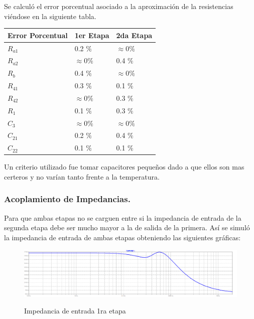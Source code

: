 Se calculó el error porcentual asociado a la aproximación de la resistencias viéndose en la siguiente tabla.
\begin{table}[H]
\centering
\begin{tabular}{lll}
\multicolumn{1}{c}{Error Porcentual} & \multicolumn{1}{c}{1er Etapa} & \multicolumn{1}{c}{2da Etapa} \\ \hline
$R_{a1}$                                & 0.2 $\%$                      & $\approx 0 \%$                \\
$R_{a2}$                                & $\approx 0 \%$                & 0.4 $\%$                      \\
$R_b$                                & 0.4 $\%$                      & $\approx 0 \%$                \\
$R_{41}$                                & 0.3 $\%$                      & 0.1 $\%$                      \\
$R_{42}$                                & $\approx 0 \%$                & 0.3 $\%$                      \\
$R_1$                                & 0.1 $\%$                      & 0.3 $\%$                      \\
$C_3$                                & $\approx 0 \%$                & $\approx 0 \%$                \\
$C_{21}$                                & 0.2 $\%$                      & 0.4 $\%$                      \\
$C_{22}$                                & 0.1 $\%$                      & 0.1 $\%$                     
\end{tabular}
\end{table}

Un criterio utilizado fue tomar capacitores pequeños dado a que ellos son mas certeros y no varían tanto frente a la temperatura.  

\subsubsection{Acoplamiento de Impedancias.}
Para que ambas etapas no se carguen entre si la impedancia de entrada de la segunda etapa debe ser mucho mayor a la de salida de la primera.
Así se simuló la impedancia de entrada de ambas etapas obteniendo las siguientes gráficas:
\begin{figure}[H]
	\centering
	\includegraphics[width=\textwidth]{Imagenes-Ej3/ZinE1.png}
	\label{fig:zine1}
	\caption{Impedancia de entrada 1ra etapa}
\end{figure}

